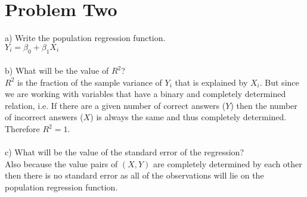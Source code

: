 \documentclass[11pt, oneside]{article}   	%
\begin{document}
\section{Problem Two}
a) Write the population regression function.\\
$Y_i = \beta_0 + \beta_1X_i$\\~\\
b) What will be the value of $R^2$? \\
$R^2$ is the fraction of the sample variance of $Y_i$ that is explained by $X_i$. But since we are working with variables that have a binary and completely determined relation, i.e. If there are a given number of correct answers ($Y$) then the number of incorrect answers ($X$) is always the same and thus completely determined. Therefore $R^2 = 1$. \\~\\
c) What will be the value of the standard error of the regression?\\
Also because the value pairs of $(X,Y)$ are completely determined by each other then there is no standard error as all of the observations will lie on the population regression function.\\
\end{document}
